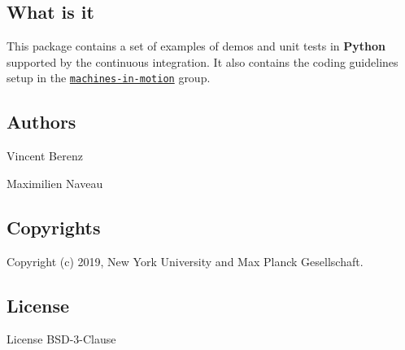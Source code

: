 \subsection*{What is it}

This package contains a set of examples of demos and unit tests in {\bfseries Python} supported by the continuous integration. It also contains the coding guidelines setup in the \href{https://wp.nyu.edu/machinesinmotion/}{\tt machines-\/in-\/motion} group.

\subsection*{Authors}


\begin{DoxyItemize}
\item Vincent Berenz
\item Maximilien Naveau
\end{DoxyItemize}

\subsection*{Copyrights}

Copyright (c) 2019, New York University and Max Planck Gesellschaft.

\subsection*{License}

License B\+S\+D-\/3-\/\+Clause 